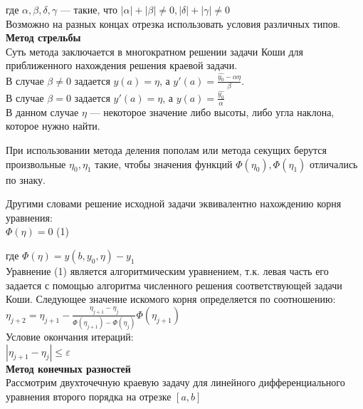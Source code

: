 где $\alpha, \beta, \delta, \gamma$ --- такие, что $|\alpha|+|\beta| \neq 0, |\delta|+|\gamma| \neq 0$\\

Возможно на разных концах отрезка использовать условия различных типов.\\

\textbf{Метод стрельбы}\\

Суть метода заключается в многократном решении задачи Коши для приближенного нахождения решения краевой задачи.\\

В случае $\beta \neq 0$ задается $y(a)=\eta$, а $y'(a)=\frac{\hat{y_0}-\alpha \eta}{\beta}$.\\
В случае $\beta = 0$ задается $y'(a)=\eta$, а $y(a)=\frac{\hat{y_0}}{\alpha}$\\

В данном случае $\eta$ --- некоторое значение либо высоты, либо угла наклона, которое нужно найти.

При использовании метода деления пополам или метода секущих берутся произвольные $\eta_0, \eta_1$ такие, чтобы значения функций $\Phi(\eta_0), \Phi(\eta_1)$ отличались по знаку.

Другими словами решение исходной задачи эквивалентно нахождению корня уравнения:\\

$\Phi(\eta)=0$ \qquad (1)

где $\Phi(\eta)=y(b, y_0, \eta)-y_1$\\

Уравнение (1) является алгоритмическим уравнением, т.к. левая часть его задается с помощью алгоритма численного решения соответствующей задачи Коши. Следующее значение искомого корня определяется по соотношению:\\

$\eta_{j+2}=\eta_{j+1}-\frac{\eta_{j+1}-\eta_j}{\Phi(\eta_{j+1})-\Phi(\eta_j)}\Phi(\eta_{j+1})$\\

Условие окончания итераций:\\

$|\eta_{j+1}-\eta_{j}| \leq \varepsilon$\\

\textbf{Метод конечных разностей}\\

Рассмотрим двухточечную краевую задачу для линейного дифференциального уравнения второго порядка на отрезке $[a, b]$\\

